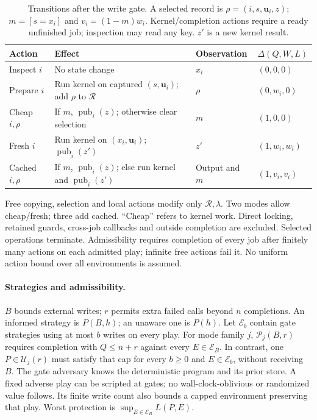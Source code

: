 \documentclass[acmsmall,screen,review,anonymous]{acmart}
\begin{document}
\begin{table}[ht]
\caption{Transitions after the write gate. A selected record is $\rho=(i,s,\mathbf u_i,z)$; $m=[s=x_i]$ and $v_i=(1-m)w_i$. Kernel/completion actions require a ready unfinished job; inspection may read any key. $z'$ is a new kernel result.}
\label{tab:calls}\centering\small
\begin{tabularx}{\linewidth}{@{}lXll@{}}
\toprule
Action & Effect & Observation & $\Delta(Q,W,L)$\\
\midrule
Inspect $i$ & No state change & $x_i$ & $(0,0,0)$\\
Prepare $i$ & Run kernel on captured $(s,\mathbf u_i)$; add $\rho$ to $\mathcal R$ & $\rho$ & $(0,w_i,0)$\\
Cheap $i,\rho$ & If $m$, $\operatorname{pub}_i(z)$; otherwise clear selection & $m$ & $(1,0,0)$\\
Fresh $i$ & Run kernel on $(x_i,\mathbf u_i)$; $\operatorname{pub}_i(z')$ & $z'$ & $(1,w_i,w_i)$\\
Cached $i,\rho$ & If $m$, $\operatorname{pub}_i(z)$; else run kernel and $\operatorname{pub}_i(z')$ & Output and $m$ & $(1,v_i,v_i)$\\
\bottomrule
\end{tabularx}
\end{table}

Free copying, selection and local actions modify only $\mathcal R,\lambda$. Two modes allow cheap/fresh; three add cached. ``Cheap'' refers to kernel work. Direct locking, retained guards, cross-job callbacks and outside completion are excluded. Selected operations terminate. Admissibility requires completion of every job after finitely many actions on each admitted play; infinite free actions fail it. No uniform action bound over all environments is assumed.

\paragraph{Strategies and admissibility.}
$B$ bounds external writes; $r$ permits extra failed calls beyond $n$ completions. An informed strategy is $P(B,h)$; an unaware one is $P(h)$. Let $\mathcal E_b$ contain gate strategies using at most $b$ writes on every play. For mode family $j$, $\mathcal P_j(B,r)$ requires completion with $Q\le n+r$ against every $E\in\mathcal E_B$. In contrast, one $P\in\mathcal U_j(r)$ must satisfy that cap for every $b\ge0$ and $E\in\mathcal E_b$, without receiving $B$. The gate adversary knows the deterministic program and its prior store. A fixed adverse play can be scripted at gates; no wall-clock-oblivious or randomized value follows. Its finite write count also bounds a capped environment preserving that play. Worst protection is $\sup_{E\in\mathcal E_B}L(P,E)$.
\end{document}
